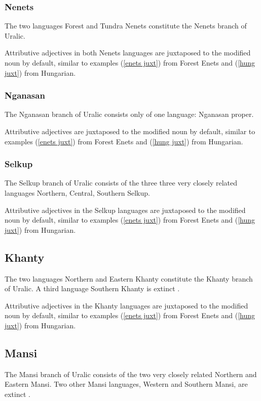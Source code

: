 \subsubsection{Nenets}
The two languages Forest and Tundra Nenets constitute the Nenets branch of Uralic.

Attributive adjectives in both Nenets languages are juxtaposed to the modified noun by default, similar to examples (\ref{enets juxt}) from Forest Enets and (\ref{hung juxt}) from Hungarian.

\subsubsection{Nganasan}
The Nganasan branch of Uralic consists only of one language: Nganasan proper.

\noindent Attributive adjectives are juxtaposed to the modified noun by default, similar to examples (\ref{enets juxt}) from Forest Enets and (\ref{hung juxt}) from Hungarian.

\subsubsection{Selkup}
The Selkup branch of Uralic consists of the three three very closely related languages Northern, Central, Southern Selkup.

\noindent Attributive adjectives in the Selkup languages are juxtaposed to the modified noun by default, similar to examples (\ref{enets juxt}) from Forest Enets and (\ref{hung juxt}) from Hungarian.

\subsection{Khanty}
The two languages Northern and Eastern Khanty constitute the Khanty branch of Uralic. A third language Southern Khanty is extinct \citep[231]{salminen2007}.

\noindent Attributive adjectives in the Khanty languages are juxtaposed to the modified noun by default, similar to examples (\ref{enets juxt}) from Forest Enets and (\ref{hung juxt}) from Hungarian.

\subsection{Mansi}
The Mansi branch of Uralic consists of the two very closely related Northern and Eastern Mansi. Two other Mansi languages, Western and Southern Mansi, are extinct \citep[231]{salminen2007}.

